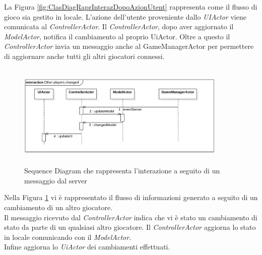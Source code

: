 La Figura \ref{fig:ClasDiagRaprInterazDopoAzionUtent} rappresenta come il flusso di gioco sia gestito in locale. L'azione dell'utente proveniente dallo \textit{UIActor} viene comunicata al \textit{ControllerActor}. Il \textit{ControllerActor}, dopo aver aggiornato il \textit{ModelActor}, notifica il cambiamento al proprio UiActor. Oltre a questo il \textit{ControllerActor} invia un messaggio anche al GameManagerActor per permettere di aggiornare anche tutti gli altri giocatori connessi. 

\begin{figure}[ht]
\centering
\includegraphics[width=10cm, height=5cm]{img/OtherPlayersInteraction.png}
\caption{Sequence Diagram che rappresenta l'interazione a seguito di un messaggio dal server}
\label{fig:ClasDiagRaprInterazDopoMsgServer}
\end{figure}

Nella Figura \ref{fig:ClasDiagRaprInterazDopoMsgServer} vi è rappresentato il flusso di informazioni generato a seguito di un cambiamento di un altro giocatore.\\
Il messaggio ricevuto dal \textit{ControllerActor} indica che vi è stato un cambiamento di stato da parte di un qualsiasi altro giocatore. Il \textit{ControllerActor} aggiorna lo stato in locale comunicando con il \textit{ModelActor}.\\
Infine aggiorna lo \textit{UiActor} dei cambiamenti effettuati.